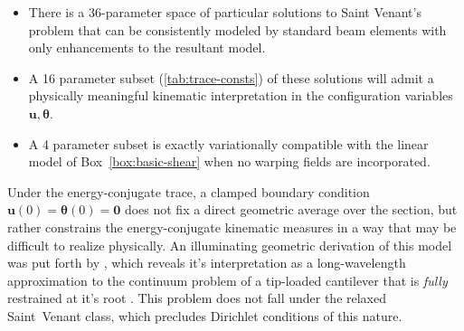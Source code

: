 \begin{itemize}
    \item There is a 36-parameter space of particular solutions to Saint Venant's problem that can be consistently modeled by standard beam elements with only enhancements to the resultant model.
    \item A 16 parameter subset (\cref{tab:trace-consts}) of these solutions will admit a physically meaningful kinematic interpretation in the configuration variables \(\bm{u},\bm{\theta}\).
    \item A  4 parameter subset is exactly variationally compatible with the linear model of Box~\ref{box:basic-shear} when no warping fields are incorporated.
\end{itemize}



Under the energy-conjugate trace, a clamped boundary condition 
$\bm{u}(0) = \bm{\theta}(0) = \mathbf{0}$ does not fix a direct geometric average over the section, but rather constrains the energy-conjugate kinematic measures in a way that may be difficult to realize physically. 
An illuminating geometric derivation of this model was put forth by \cite{serpieri2014equivalence}, which reveals it's interpretation as a long-wavelength approximation to the continuum problem of a tip-loaded cantilever that is \emph{fully} restrained at it's root \cite{ladeveze1998new}. 
This problem does not fall under the relaxed Saint~Venant class, which precludes Dirichlet conditions of this nature. 




